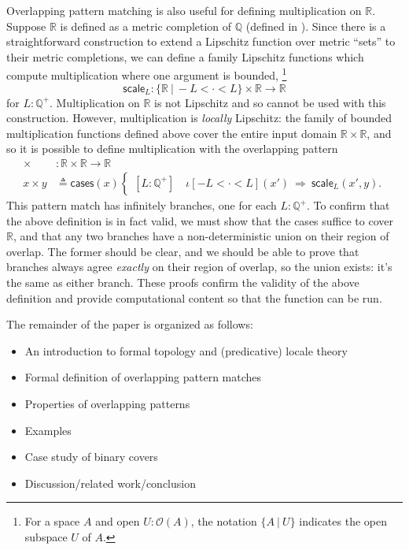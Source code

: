 \documentclass[conference]{IEEEtran}
\newcommand{\R}{\mathbb{R}}
\newcommand{\rat}{\mathbb{Q}}
\newcommand{\suchthat}{\ |\ }
\newcommand{\Open}[1]{\mathcal{O}({#1})}
\newcommand{\oinclf}[1]{\iota[{#1}]}
\newcommand{\oincl}[2]{\oinclf{#1} \left({#2}\right)}
\newcommand{\Branch}{\Rightarrow}
\begin{document}
Overlapping pattern matching is also useful for defining multiplication on $\R$. Suppose $\R$ is defined as a metric completion of $\rat$ (defined in \cite{vickersmetric}). Since there is a straightforward construction to extend a Lipschitz function over metric ``sets'' to their metric completions, we can define a family Lipschitz functions which compute multiplication where one argument is bounded, \footnote{For a space $A$ and open $U : \Open{A}$, the notation $\{ A \suchthat U \}$ indicates the open subspace $U$ of $A$.}
\[
\mathsf{scale}_L : \{ \R \suchthat -L < \cdot < L \} \times \R \to \R
\]
for $L : \rat^+$. Multiplication on $\R$ is not Lipschitz and so cannot be used with this construction. However, multiplication is \emph{locally} Lipschitz: the family of bounded multiplication functions defined above cover the entire input domain $\R \times \R$, and so it is possible to define multiplication with the overlapping pattern
\begin{align*}
\times &: \R \times \R \to \R
\\ x \times y &\triangleq
\mathsf{cases}(x)
\begin{cases}
[L : \rat^+] \quad \oincl{-L < \cdot < L}{x'}  \  \Branch \  \mathsf{scale}_L(x', y).
\end{cases}
\end{align*}
This pattern match has infinitely branches, one for each $L : \rat^+$. To confirm that the above definition is in fact valid, we must show that the cases suffice to cover $\R$, and that any two branches have a non-deterministic union on their region of overlap. The former should be clear, and we should be able to prove that branches always agree \emph{exactly} on their region of overlap, so the union exists: it's the same as either branch. These proofs confirm the validity of the above definition and provide computational content so that the function can be run.

The remainder of the paper is organized as follows:
\begin{itemize}
\item An introduction to formal topology and (predicative) locale theory
\item Formal definition of overlapping pattern matches
\item Properties of overlapping patterns
\item Examples
\item Case study of binary covers
\item Discussion/related work/conclusion
\end{itemize}
\end{document}
